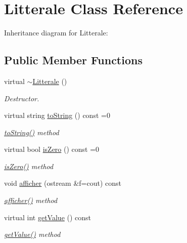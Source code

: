 \hypertarget{class_litterale}{}\section{Litterale Class Reference}
\label{class_litterale}


Inheritance diagram for Litterale\+:
\subsection*{Public Member Functions}
\begin{DoxyCompactItemize}
\item 
virtual \hyperlink{class_litterale_abd6b3faa8cda262bb5fab57e1e323090}{$\sim$\+Litterale} ()
\begin{DoxyCompactList}\small\item\em Destructor. \end{DoxyCompactList}\item 
virtual string \hyperlink{class_litterale_a3041839e5494df2c93bff2c5cb83ce1f}{to\+String} () const  =0
\begin{DoxyCompactList}\small\item\em \hyperlink{class_litterale_a3041839e5494df2c93bff2c5cb83ce1f}{to\+String()} method \end{DoxyCompactList}\item 
virtual bool \hyperlink{class_litterale_a535fc431d96954754b7a729404df4a79}{is\+Zero} () const  =0
\begin{DoxyCompactList}\small\item\em \hyperlink{class_litterale_a535fc431d96954754b7a729404df4a79}{is\+Zero()} method \end{DoxyCompactList}\item 
void \hyperlink{class_litterale_ae33587fb3c4a929c9ee29d9c6b49aea6}{afficher} (ostream \&f=cout) const 
\begin{DoxyCompactList}\small\item\em \hyperlink{class_litterale_ae33587fb3c4a929c9ee29d9c6b49aea6}{afficher()} method \end{DoxyCompactList}\item 
virtual int \hyperlink{class_litterale_a9cd3d639341cb797bcf2b6400d6ad43d}{get\+Value} () const 
\begin{DoxyCompactList}\small\item\em \hyperlink{class_litterale_a9cd3d639341cb797bcf2b6400d6ad43d}{get\+Value()} method \end{DoxyCompactList}\item 

\end{DoxyCompactItemize}
